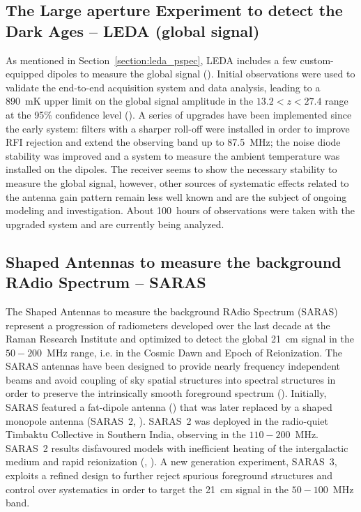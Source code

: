 \subsection{The Large aperture Experiment to detect the Dark Ages -- LEDA (global signal)}
\label{leda_global}
As mentioned in Section~\ref{section:leda_pspec}, LEDA includes a few custom-equipped dipoles to measure the global signal (\cite{price18}). Initial observations were used to validate the end-to-end acquisition system and data analysis, leading to a 890~mK upper limit on the global signal amplitude in the $13.2 < z < 27.4$ range at the 95\% confidence level (\cite{bernardi16}). A series of upgrades have been implemented since the early system: filters with a sharper roll-off were installed in order to improve RFI rejection and extend the observing band up to 87.5~MHz; the noise diode stability was improved and a system to measure the ambient temperature was installed on the dipoles. The receiver seems to show the necessary stability to measure the global signal, however, other sources of systematic effects related to the antenna gain pattern remain less well known and are the subject of ongoing modeling and investigation.
%
About 100~hours of observations were taken with the upgraded system and are currently being analyzed.
%


\subsection{Shaped Antennas to measure the background RAdio Spectrum -- SARAS}

The Shaped Antennas to measure the background RAdio Spectrum (SARAS) represent a progression of radiometers developed over the last decade at the Raman Research Institute and optimized to detect the global 21~cm signal in the $50-200$~MHz range, i.e. in the Cosmic Dawn and Epoch of Reionization.
%
The SARAS antennas have been designed to provide nearly frequency independent beams and avoid coupling of sky spatial structures into spectral structures in order to preserve the intrinsically smooth foreground spectrum (\cite{sathyanarayana17}).
%
Initially, SARAS featured a fat-dipole antenna (\cite{patra13}) that was later replaced by a shaped monopole antenna (SARAS~2, \cite{singh18a}). SARAS~2 was deployed in the radio-quiet Timbaktu Collective in Southern India, observing in the $110-200$~MHz. SARAS~2 results disfavoured models with inefficient heating of the intergalactic medium and rapid reionization (\cite{singh17}, \cite{singh18b}). 
A new generation experiment, SARAS~3, exploits a refined design to further reject spurious foreground structures and control over systematics in order to target the 21~cm signal in the $50-100$~MHz band.





